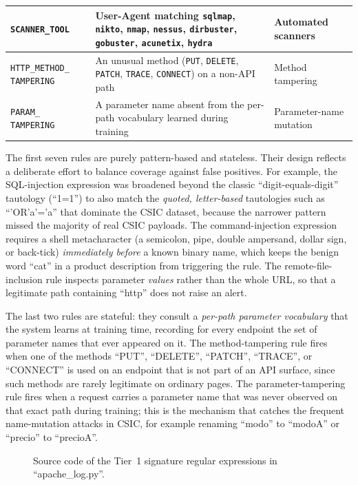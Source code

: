 \documentclass[12pt,a4paper]{report}
\begin{document}
\begin{table}[ht]
\begin{tabular}{|p{3.2cm}|p{6.6cm}|p{2.6cm}|}
    \hline
    \texttt{SCANNER\_TOOL} & User-Agent matching \texttt{sqlmap}, \texttt{nikto}, \texttt{nmap}, \texttt{nessus}, \texttt{dirbuster}, \texttt{gobuster}, \texttt{acunetix}, \texttt{hydra} & Automated scanners \\
    \hline
    \texttt{HTTP\_METHOD\_} \texttt{TAMPERING} & An unusual method (\texttt{PUT}, \texttt{DELETE}, \texttt{PATCH}, \texttt{TRACE}, \texttt{CONNECT}) on a non-API path & Method tampering \\
    \hline
    \texttt{PARAM\_} \texttt{TAMPERING} & A parameter name absent from the per-path vocabulary learned during training & Parameter-name mutation \\
    \hline
  \end{tabular}
\end{table}

The first seven rules are purely pattern-based and stateless. Their design
reflects a deliberate effort to balance coverage against false positives. For
example, the SQL-injection expression was broadened beyond the classic
``digit-equals-digit'' tautology (``1=1'') to also match the
\emph{quoted, letter-based} tautologies such as ``'OR'a'='a'' that
dominate the CSIC dataset, because the narrower pattern missed the majority
of real CSIC payloads. The command-injection expression requires a
shell metacharacter (a semicolon, pipe, double ampersand, dollar sign, or
back-tick) \emph{immediately before} a known binary name, which keeps the
benign word ``cat'' in a product description from triggering the rule. The
remote-file-inclusion rule inspects parameter \emph{values} rather than the
whole URL, so that a legitimate path containing ``http'' does not raise
an alert.

The last two rules are stateful: they consult a \emph{per-path parameter
vocabulary} that the system learns at training time, recording for every
endpoint the set of parameter names that ever appeared on it. The
method-tampering rule fires when one of the methods ``PUT'',
``DELETE'', ``PATCH'', ``TRACE'', or ``CONNECT'' is used
on an endpoint that is not part of an API surface, since such methods are
rarely legitimate on ordinary pages. The parameter-tampering rule fires when
a request carries a parameter name that was never observed on that exact path
during training; this is the mechanism that catches the frequent
name-mutation attacks in CSIC, for example renaming ``modo'' to
``modoA'' or ``precio'' to ``precioA''.

\begin{figure}[ht]
  \centering
  \caption{Source code of the Tier~1 signature regular expressions in
           ``apache\_log.py''.}
  \label{fig:code-regex}
\end{figure}
\end{document}
